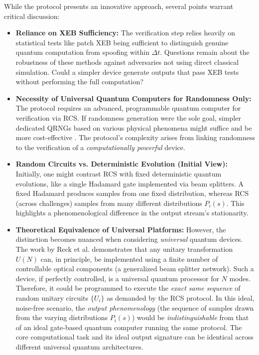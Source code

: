 \documentclass[11pt, a4paper]{article}
\begin{document}
While the protocol presents an innovative approach, several points warrant critical discussion:

\begin{itemize}
    \item \textbf{Reliance on XEB Sufficiency:} The verification step relies heavily on statistical tests like patch XEB being sufficient to distinguish genuine quantum computation from spoofing within $\Delta t$. Questions remain about the robustness of these methods against adversaries not using direct classical simulation. Could a simpler device generate outputs that pass XEB tests without performing the full computation?
    \item \textbf{Necessity of Universal Quantum Computers for Randomness Only:} The protocol requires an advanced, programmable quantum computer for verification via RCS. If randomness generation were the sole goal, simpler dedicated QRNGs based on various physical phenomena might suffice and be more cost-effective \cite{HerreroQRNGReview}. The protocol's complexity arises from linking randomness to the verification of a \textit{computationally powerful}  device.
    \item \textbf{Random Circuits vs. Deterministic Evolution (Initial View):} Initially, one might contrast RCS with fixed deterministic quantum evolutions, like a single Hadamard gate implemented via beam splitters. A fixed Hadamard produces samples from one fixed distribution, whereas RCS (across challenges) samples from many different distributions $P_i(s)$. This highlights a phenomenological difference in the output stream's stationarity.
    \item \textbf{Theoretical Equivalence of Universal Platforms:} However, the distinction becomes nuanced when considering \textit{universal}  quantum devices. The work by Reck et al. \cite{ReckZeilinger} demonstrates that any unitary transformation $U(N)$ can, in principle, be implemented using a finite number of controllable optical components (a generalized beam splitter network). Such a device, if perfectly controlled, is a universal quantum processor for $N$ modes. Therefore, it could be programmed to execute the \textit{exact same sequence}  of random unitary circuits $\{U_i\}$ as demanded by the RCS protocol. In this ideal, noise-free scenario, the \textit{output phenomenology}  (the sequence of samples drawn from the varying distributions $P_i(s)$) would be \textit{indistinguishable}   from that of an ideal gate-based quantum computer running the same protocol. The core computational task and its ideal output signature can be identical across different universal quantum architectures.
\end{itemize}
\end{document}

